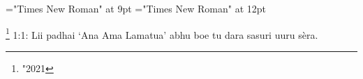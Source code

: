 \font\footnotescriptureText="Times New Roman" at 9pt
\font\scriptureText="Times New Roman" at 12pt

  \footnote {\char "2021} {1:1: Lii padhai ‘Ana Ama Lamatua’ abhu boe tu dara sasuri uuru
                  sèra.}

\bye
